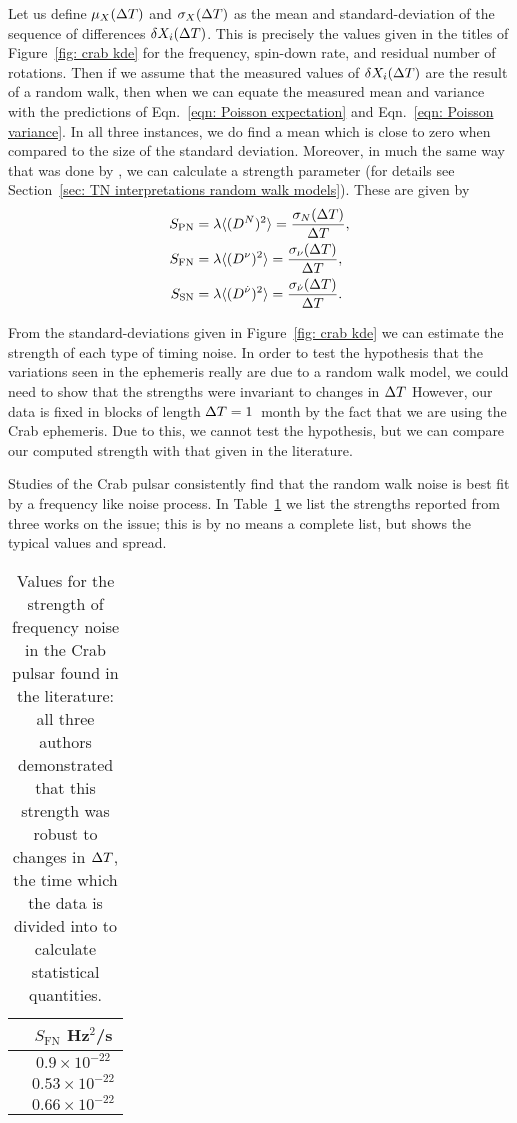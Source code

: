 \documentclass[../full_thesis/full_thesis.tex]{subfiles}
\begin{document}
{Let us define $\mu_{X}(\Delta T)$ and $\sigma_X(\Delta T)$ as the mean and
standard-deviation of the sequence of differences $\delta X_{i}(\Delta T)$.  This is
precisely the values given in the titles of Figure~\ref{fig: crab kde} for the
frequency, spin-down rate, and residual number of rotations.
Then if we assume that the measured values of $\delta X_i(\Delta T)$ are the result of a
random walk, then when we can equate the measured mean and variance with the
predictions of Eqn.~\eqref{eqn: Poisson expectation} and Eqn.~\eqref{eqn:
Poisson variance}. In all three instances, we do find a mean which is close to
zero when compared to the size of the standard deviation. Moreover, in much the
same way that was done by \citet{Cordes1980}, we can calculate a strength
parameter (for details see Section~\ref{sec: TN interpretations random walk
models}). These are given by
\begin{align}
S_{\mathrm{PN}} & = \lambda \langle (D^N)^{2} \rangle = \frac{\sigma_N(\Delta T)}{\Delta T}, \\
S_{\mathrm{FN}} & = \lambda \langle (D^\nu)^{2} \rangle = \frac{\sigma_\nu(\Delta T)}{\Delta T},
\label{eqn: SFN} \\
S_{\mathrm{SN}} & = \lambda \langle (D^{\dot{\nu}})^{2} \rangle = 
\frac{\sigma_{\dot{\nu}}(\Delta T)}{\Delta T}.
\end{align}

From the standard-deviations given in Figure~\ref{fig: crab kde} we can
estimate the strength of each type of timing noise. In order to test the
hypothesis that the variations seen in the ephemeris really are due to a random
walk model, we could need to show that the strengths were invariant to changes
in $\Delta T$ However, our data is fixed in blocks of length $\Delta T = 1$~month by the
fact that we are using the Crab ephemeris. Due to this, we cannot test the
hypothesis, but we can compare our computed strength with that given in
the literature.

Studies of the Crab pulsar consistently find that the random walk noise is
best fit by a frequency like noise process. In Table~\ref{tab: SFN lit} we list
the strengths reported from three works on the issue; this is by no means a
complete list, but shows the typical values and spread.
\begin{table}[htb]
\centering
\begin{tabular}{c|c}
 & $S_{\textrm{FN}}$ Hz$^{2}$/s\\ \hline
\citet{Boynton1972} & $0.9\times10^{-22}$\\
\citet{Groth1975} & $ 0.53\times10^{-22}$\\
\citet{Cordes1980} & $0.66\times10^{-22}$
\end{tabular}
\caption{Values for the strength of frequency noise in the Crab pulsar found
         in the literature: all three authors demonstrated that this strength
         was robust to changes in $\Delta T$, the time which the data is divided into
         to calculate statistical quantities.}
\label{tab: SFN lit}
\end{table}

}
\end{document}
